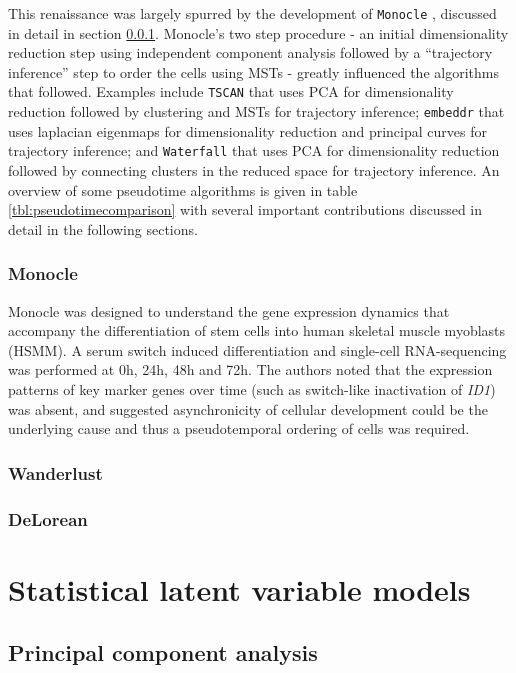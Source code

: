 This renaissance was largely spurred by the development of \texttt{Monocle} \cite{trapnell2014dynamics}, discussed in detail in section \ref{tbl:monocle}. Monocle's two step procedure - an initial dimensionality reduction step using independent component analysis followed by a ``trajectory inference'' step to order the cells using MSTs - greatly influenced the algorithms that followed. Examples include \texttt{TSCAN} that uses PCA for dimensionality reduction followed by clustering and MSTs for trajectory inference; \texttt{embeddr} that uses laplacian eigenmaps for dimensionality reduction and principal curves for trajectory inference; and \texttt{Waterfall} that uses PCA for dimensionality reduction followed by connecting clusters in the reduced space for trajectory inference. An overview of some pseudotime algorithms is given in table \ref{tbl:pseudotimecomparison} with several important contributions discussed in detail in the following sections.

\subsubsection{Monocle} \label{tbl:monocle}

Monocle was designed to understand the gene expression dynamics that accompany the differentiation of stem cells into human skeletal muscle myoblasts (HSMM). A serum switch induced differentiation and single-cell RNA-sequencing was performed at 0h, 24h, 48h and 72h. The authors noted that the expression patterns of key marker genes over time (such as switch-like inactivation of \emph{ID1}) was absent, and suggested asynchronicity of cellular development could be the underlying cause and thus a pseudotemporal ordering of cells was required.

\subsubsection{Wanderlust}

\subsubsection{DeLorean}



\section{Statistical latent variable models}

\subsection{Principal component analysis}

